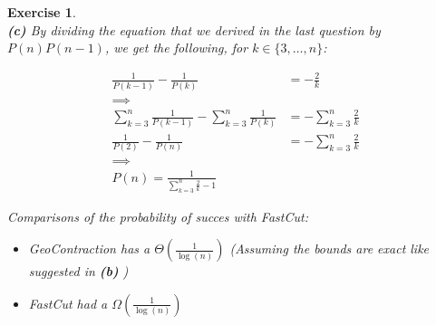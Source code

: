 \documentclass{article}
\newtheorem{exo}{Exercise}
\begin{document}
\begin{exo}{\ \\}
\noindent
\textbf{(c)} By dividing the equation that we derived in the last question by $P(n)P(n-1)$, we get the following, for $k \in \{3, \dots, n\}$:

\begin{align*}
    \frac{1}{P(k-1)} - \frac{1}{P(k)}  &= - \frac{2}{k}  \\
    \implies & \\
    \sum_{k=3}^{n} \frac{1}{P(k-1)} - \sum_{k=3}^{n} \frac{1}{P(k)}  &=
    - \sum_{k=3}^{n} \frac{2}{k}  \\
    \frac{1}{P(2)} - \frac{1}{P(n)}  &= -\sum_{k=3}^{n} \frac{2}{k}  \\
    \implies &\\
    P(n) = \frac{1}{\sum_{k=3}^{n} \frac{2}{k} -1} 
\end{align*}

Comparisons of the probability of succes with FastCut:

\begin{itemize} 
    \item GeoContraction has a $\Theta(\frac{1}{\log(n)})$ (Assuming the bounds are exact like suggested in \textbf{(b)} )
    \item FastCut had a $\Omega(\frac{1}{\log(n)})$ 
\end{itemize}


\end{exo}
\end{document}
